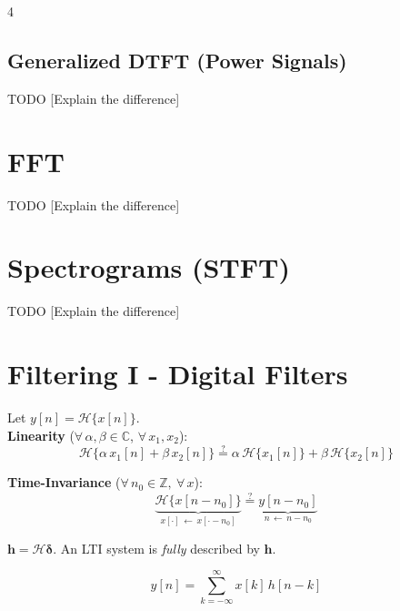 \documentclass[8pt,a4paper,landscape]{extarticle}
\begin{document}
\begin{multicols*}{4}
\subsection{Generalized DTFT (Power Signals)}
TODO [Explain the difference]

\section{FFT}
TODO [Explain the difference]

\section{Spectrograms (STFT)}
TODO [Explain the difference]


\newpage

\section{Filtering I - Digital Filters}

\begin{defn}[title=LTI: Linearity \& time-invariance]
Let $y[n] = \mathcal{H}\{x[n]\}$. \\
\textbf{Linearity} ($\forall\, \alpha,\beta \in\mathbb{C}$, $\forall\, x_1, x_2$):
\[
    \mathcal{H}\{\alpha\, x_1[n] + \beta\, x_2[n]\} \stackrel{?}{=} \alpha\, \mathcal{H}\{x_1[n]\} + \beta\, \mathcal{H}\{x_2[n]\}
\]

\textbf{Time-Invariance} ($\forall\, n_0 \in \mathbb{Z},\ \forall\, x$):
\[
    \underbrace{\mathcal{H}\{x[n - n_0]\}}_{x[\cdot] \,\leftarrow\, x[\cdot - n_0]} \stackrel{?}{=} \underbrace{y[n - n_0]}_{n \,\leftarrow\, n - n_0}
\]
\end{defn}


\begin{thm}[title=Impulse response]
$\mathbf{h}=\mathcal{H}\boldsymbol{\delta}$. An LTI system is \emph{fully} described by $\mathbf{h}$.
\end{thm}

\begin{defn}[title={Convolution $\mathbf{y}=\mathbf{x}*\mathbf{h}$}]
\[y[n]=\sum_{k=-\infty}^{\infty}x[k]\,h[n-k]\]
\end{defn}


\end{multicols*}
\end{document}
